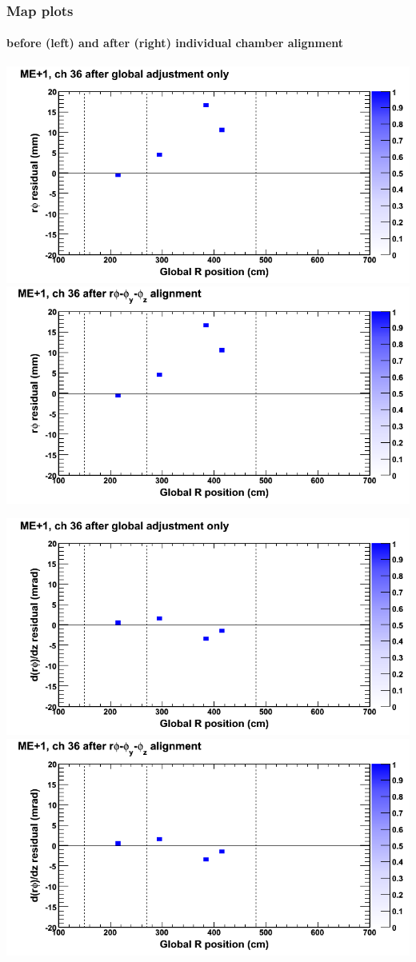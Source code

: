 \documentclass[compress]{beamer}
\begin{document}
\begin{frame}
\frametitle{Map plots}
\framesubtitle{before (left) and after (right) individual chamber alignment}
\includegraphics[width=0.5\linewidth]{ringmapplots_3dof/before_CSCvsr_mep1ch36_x.png} \includegraphics[width=0.5\linewidth]{ringmapplots_3dof/after_CSCvsr_mep1ch36_x.png}

\includegraphics[width=0.5\linewidth]{ringmapplots_3dof/before_CSCvsr_mep1ch36_dxdz.png} \includegraphics[width=0.5\linewidth]{ringmapplots_3dof/after_CSCvsr_mep1ch36_dxdz.png}
\end{frame}
\end{document}
